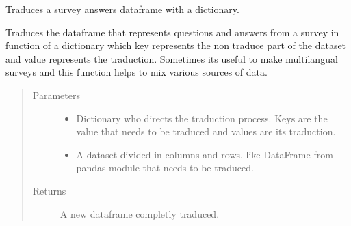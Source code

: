 \documentclass[letterpaper,10pt,english]{sphinxmanual}
\begin{document}

\begin{fulllineitems}
\label{\detokenize{index:SurveyHumpbackWhale.traduce_survey_with_dictionary}}
Traduces a survey answers dataframe with a dictionary.

Traduces the dataframe that represents questions and answers from a survey
in function of a dictionary which key represents the non traduce part of
the dataset and value represents the traduction. Sometimes its useful to
make multilangual surveys and this function helps to mix various sources
of data.
\begin{quote}\begin{description}
\item[{Parameters}] \leavevmode\begin{itemize}
\item {} 
 \textendash{} Dictionary who directs the traduction process. Keys
are the value that needs to be traduced and values are
its traduction.

\item {} 
 \textendash{} A dataset divided in columns and rows, like DataFrame from
pandas module that needs to be traduced.

\end{itemize}

\item[{Returns}] \leavevmode
A new dataframe completly traduced.

\end{description}\end{quote}

\end{fulllineitems}



\renewcommand{\indexname}{Python Module Index}
\begin{sphinxtheindex}
\let\bigletter\sphinxstyleindexlettergroup
\bigletter{s}
\item\relax{}
\end{sphinxtheindex}

\renewcommand{\indexname}{Index}
\printindex
\end{document}
